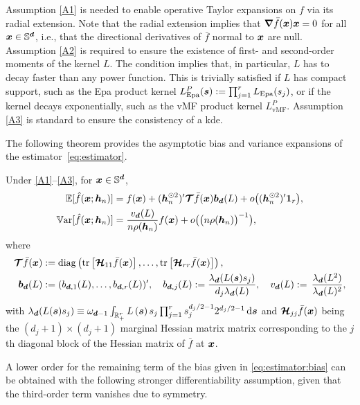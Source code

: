 \documentclass[oneside,11pt]{article}
\begin{document}
Assumption \ref{A1} is needed to enable operative Taylor expansions on $f$ via its radial extension. Note that the radial extension implies that $\boldsymbol\nabla \bar{f}(\boldsymbol{x})\boldsymbol{x}=0$ for all $\boldsymbol{x}\in\mathbb{S}^{\boldsymbol{d}}$, i.e., that the directional derivatives of $\bar{f}$ normal to $\boldsymbol{x}$ are null. Assumption \ref{A2} is required to ensure the existence of first- and second-order moments of the kernel $L$. The condition implies that, in particular, $L$ has to decay faster than any power function. This is trivially satisfied if $L$ has compact support, such as the Epa product kernel $L_\mathrm{Epa}^P(\boldsymbol{s}):=\prod_{j=1}^r L_\mathrm{Epa}(s_j)$, or if the kernel decays exponentially, such as the vMF product kernel $L_\mathrm{vMF}^P$. Assumption \ref{A3} is standard to ensure the consistency of a kde.

The following theorem provides the asymptotic bias and variance expansions of the estimator~\eqref{eq:estimator}.

\begin{theorem}\label{thm:biasvar}
Under \ref{A1}--\ref{A3}, for $\boldsymbol{x}\in\mathbb{S}^{\boldsymbol{d}}$,
\begin{align}
 \mathbb{E}[\hat{f}(\boldsymbol{x};{\boldsymbol{h}}_n)]&=f(\boldsymbol{x})+({\boldsymbol{h}}_n^{\odot 2})'\boldsymbol{\mathcal{T}}\bar{f}(\boldsymbol{x})\boldsymbol{b}_{\boldsymbol{d}}(L)+o\big(({\boldsymbol{h}}_n^{\odot 2})'\mathbf{1}_r\big),\label{eq:estimator:bias}\\
	\mathbb{V}\mathrm{ar}[\hat{f}(\boldsymbol{x};{\boldsymbol{h}}_n)]&=\frac{v_{\boldsymbol{d}}(L)}{n\rho({\boldsymbol{h}}_n)}f(\boldsymbol{x}) +o\big(\big(n \rho({\boldsymbol{h}}_n)\big)^{-1}\big),\label{eq:estimator:variance}
\end{align}
where
\begin{align}
        \boldsymbol{\mathcal{T}}\bar{f}(\boldsymbol{x}):=&\;\mathrm{diag}\left( \mathrm{tr}\left[\boldsymbol{\mathcal{H}}_{11}\bar{f}(\boldsymbol{x})\right],\ldots,\mathrm{tr}\left[\boldsymbol{\mathcal{H}}_{rr}\bar{f}(\boldsymbol{x})\right]\right),\nonumber\\
        \boldsymbol{b}_{\boldsymbol{d}}(L):=&\; (b_{\boldsymbol{d},1}(L),\ldots,b_{\boldsymbol{d},r}(L))',\quad b_{\boldsymbol{d},j}(L):=\frac{\lambda_{\boldsymbol{d}}(L(\boldsymbol{s})s_j)}{d_j \lambda_{\boldsymbol{d}}(L)}, \quad v_{\boldsymbol{d}}(L):=\, \frac{\lambda_{\boldsymbol{d}}(L^2)}{\lambda_{\boldsymbol{d}}(L)^2},\label{eq:moments}
\end{align}
with
$\lambda_{\boldsymbol{d}}(L(\boldsymbol{s})s_j)\equiv\omega_{\boldsymbol{d}-1}\int_{\mathbb{R}_+^r}L\left(\boldsymbol{s}\right) s_j \prod_{j=1}^r s_j^{d_j/2-1} 2^{d_j/2-1}\,\mathrm{d} \boldsymbol{s}$ and  $\boldsymbol{\mathcal{H}}_{jj}\bar{f}(\boldsymbol{x})$ being the $(d_j+1)\times(d_j+1)$ marginal Hessian matrix matrix corresponding to the $j$th diagonal block of the Hessian matrix of $\bar{f}$ at $\boldsymbol{x}$.
\end{theorem}

A lower order for the remaining term of the bias given in \eqref{eq:estimator:bias} can be obtained with the following stronger differentiability assumption, given that the third-order term vanishes due to symmetry.
\end{document}
